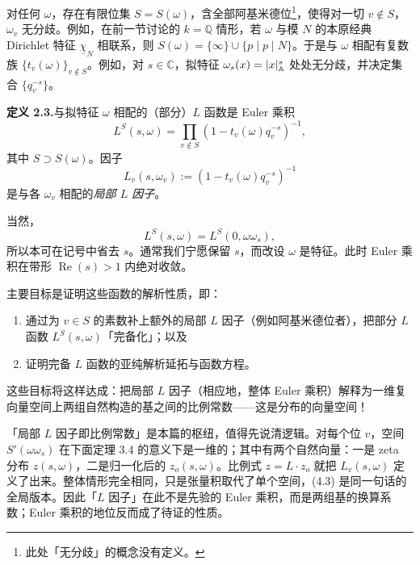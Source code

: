 对任何 $\omega$，存在有限位集 $S=S(\omega)$，含全部阿基米德位\footnote{此处「无分歧」的概念没有定义。}，使得对一切 $v\notin S$，$\omega_v$ 无分歧。例如，在前一节讨论的 $k=\mathbb Q$ 情形，若 $\omega$ 与模 $N$ 的本原经典 Dirichlet 特征 $\underline\chi_N$ 相联系，则 $S(\omega)=\{\infty\}\cup\{p\mid p\mid N\}$。于是与 $\omega$ 相配有复数族 $\{t_v(\omega)\}_{v\notin S}$。例如，对 $s\in\mathbb C$，拟特征 $\omega_s(x)=|x|_{\mathbb{A}}^s$ 处处无分歧，并决定集合 $\{q_v^{-s}\}$。

\medskip\noindent\textbf{定义 2.3.}\quad 与拟特征 $\omega$ 相配的（部分）$L$ 函数是 Euler 乘积
\begin{equation*}\tag{EP}
L^S(s,\omega)=\prod_{v\notin S}(1-t_v(\omega)q_v^{-s})^{-1},
\end{equation*}
其中 $S\supset S(\omega)$。因子
\[
L_v(s,\omega_v):=(1-t_v(\omega)q_v^{-s})^{-1}
\]
是与各 $\omega_v$ 相配的\emph{局部 $L$ 因子}。

当然，
\[
L^S(s,\omega)=L^S(0,\omega\omega_s),
\]
所以本可在记号中省去 $s$。通常我们宁愿保留 $s$，而改设 $\omega$ 是特征。此时 Euler 乘积在带形 $\operatorname{Re}(s)>1$ 内绝对收敛。

主要目标是证明这些函数的解析性质，即：
\begin{enumerate}[label=\arabic*.,leftmargin=2.2em,itemsep=0.2em]
\item 通过为 $v\in S$ 的素数补上额外的局部 $L$ 因子（例如阿基米德位者），把部分 $L$ 函数 $L^S(s,\omega)$「完备化」；以及
\item 证明完备 $L$ 函数的亚纯解析延拓与函数方程。
\end{enumerate}

这些目标将这样达成：把局部 $L$ 因子（相应地，整体 Euler 乘积）解释为一维复向量空间上两组自然构造的基之间的比例常数——这是分布的向量空间！

\begin{annote}
「局部 $L$ 因子即比例常数」是本篇的枢纽，值得先说清逻辑。对每个位 $v$，空间 $S'(\omega\omega_s)$ 在下面定理 3.4 的意义下是一维的；其中有两个自然向量：一是 zeta 分布 $z(s,\omega)$，二是归一化后的 $z_o(s,\omega)$。比例式 $z=L\cdot z_o$ 就把 $L_v(s,\omega)$ 定义了出来。整体情形完全相同，只是张量积取代了单个空间，(4.3) 是同一句话的全局版本。因此「$L$ 因子」在此不是先验的 Euler 乘积，而是两组基的换算系数；Euler 乘积的地位反而成了待证的性质。
\par\vspace{0.15em}{\raggedleft 【来源：Tate 论文 §2--§3；Weil《Bourbaki 报告》(1966)（A）】\par}
\end{annote}

